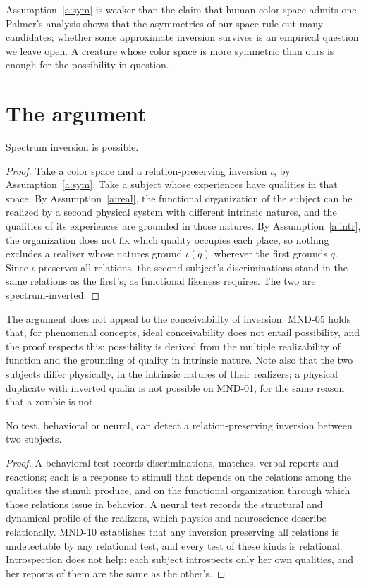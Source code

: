 \documentclass{situationist-preprint}
\begin{document}
Assumption~\ref{a:sym} is weaker than the claim that human color space admits one. Palmer's analysis shows that the asymmetries of our space rule out many candidates; whether some approximate inversion survives is an empirical question we leave open. A creature whose color space is more symmetric than ours is enough for the possibility in question.

\section{The argument}

\begin{proposition}\label{p:poss}
Spectrum inversion is possible.
\end{proposition}

\begin{proof}
Take a color space and a relation-preserving inversion $\iota$, by Assumption~\ref{a:sym}. Take a subject whose experiences have qualities in that space. By Assumption~\ref{a:real}, the functional organization of the subject can be realized by a second physical system with different intrinsic natures, and the qualities of its experiences are grounded in those natures. By Assumption~\ref{a:intr}, the organization does not fix which quality occupies each place, so nothing excludes a realizer whose natures ground $\iota(q)$ wherever the first grounds $q$. Since $\iota$ preserves all relations, the second subject's discriminations stand in the same relations as the first's, as functional likeness requires. The two are spectrum-inverted.
\end{proof}

The argument does not appeal to the conceivability of inversion. MND-05 holds that, for phenomenal concepts, ideal conceivability does not entail possibility, and the proof respects this: possibility is derived from the multiple realizability of function and the grounding of quality in intrinsic nature. Note also that the two subjects differ physically, in the intrinsic natures of their realizers; a physical duplicate with inverted qualia is not possible on MND-01, for the same reason that a zombie is not.

\begin{proposition}\label{p:undet}
No test, behavioral or neural, can detect a relation-preserving inversion between two subjects.
\end{proposition}

\begin{proof}
A behavioral test records discriminations, matches, verbal reports and reactions; each is a response to stimuli that depends on the relations among the qualities the stimuli produce, and on the functional organization through which those relations issue in behavior. A neural test records the structural and dynamical profile of the realizers, which physics and neuroscience describe relationally. MND-10 establishes that any inversion preserving all relations is undetectable by any relational test, and every test of these kinds is relational. Introspection does not help: each subject introspects only her own qualities, and her reports of them are the same as the other's.
\end{proof}
\end{document}
